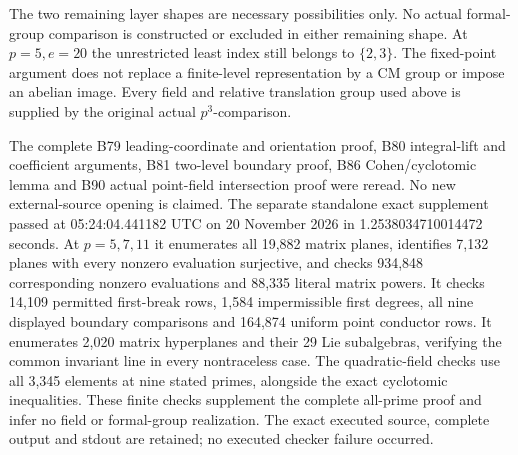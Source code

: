 \begin{remark}
\label{rem:B-RD97-scope}
The two remaining layer shapes are necessary possibilities only.
No actual formal-group comparison is constructed or excluded in
either remaining shape. At $p=5,e=20$ the unrestricted least index
still belongs to $\{2,3\}$. The fixed-point argument does not
replace a finite-level representation by a CM group or impose an
abelian image. Every field and relative translation group used
above is supplied by the original actual $p^3$-comparison.

The complete B79 leading-coordinate and orientation proof, B80
integral-lift and coefficient arguments, B81 two-level boundary
proof, B86 Cohen/cyclotomic lemma and B90 actual point-field
intersection proof were reread. No new external-source opening
is claimed. The separate standalone exact supplement
passed at 05:24:04.441182 UTC on 20 November 2026 in
1.2538034710014472 seconds. At $p=5,7,11$ it enumerates all
19,882 matrix planes, identifies 7,132 planes with every nonzero
evaluation surjective, and checks 934,848 corresponding nonzero
evaluations and 88,335 literal matrix powers. It checks 14,109
permitted first-break rows, 1,584 impermissible first degrees, all
nine displayed boundary comparisons and 164,874 uniform point
conductor rows. It enumerates 2,020 matrix hyperplanes and their
29 Lie subalgebras, verifying the common invariant line in every
nontraceless case. The quadratic-field checks use all 3,345
elements at nine stated primes, alongside the exact cyclotomic
inequalities. These finite checks supplement the complete all-prime
proof and infer no field or formal-group realization. The exact
executed source, complete output and stdout are retained; no
executed checker failure occurred.
\end{remark}
